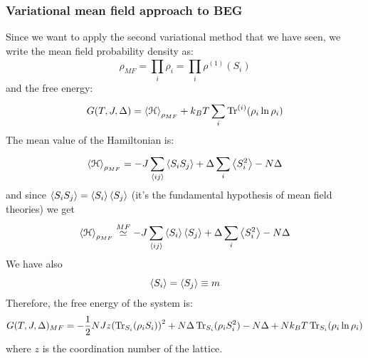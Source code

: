 \documentclass[../main/main.tex]{subfiles}
\begin{document}
\subsubsection{Variational mean field approach to BEG}
Since we want to apply the second variational method that we have seen, we write the mean field probability density as:
\begin{equation*}
  \rho _{MF} = \prod_{i}^{} \rho _i   =  \prod_{i}^{} \rho^{(1)} (S_i)
\end{equation*}
and the free energy:
\begin{equation}
  G(T,J,\Delta ) = \expval{\mathcal{H}}_{\rho _{MF}} + k_B T \sum_{i}^{} \Tr^{(i)}(\rho _i \ln{\rho _i } )
\end{equation}
The mean value of the Hamiltonian is:
\begin{equation*}
\expval{\mathcal{H}}_{\rho _{MF}}   = - J \sum_{\expval{ij} }^{} \expval{S_i S_j}  + \Delta \sum_{i}^{} \expval{S_i^2} - N \Delta  
\end{equation*}
and since \(\expval{S_i S_j} = \expval{S_i} \expval{S_j} \) (it's the fundamental hypothesis of mean field theories) we get
\begin{equation*}
\expval{\mathcal{H}}_{\rho _{MF}} \overset{MF}{\simeq } - J \sum_{\expval{ij} }^{} \expval{S_i} \expval{S_j} + \Delta \sum_{i}^{} \expval{S_i^2} - N \Delta   
\end{equation*}
We have also
\begin{equation*}
  \expval{S_i} = \expval{S_j} \equiv m
\end{equation*}
Therefore, the free energy of the system is:
\begin{equation}
  G(T,J, \Delta )_{MF}  = - \frac{1}{2} N J z \qty( \Tr_{S_i}(\rho _i S_i) )^2
  + N \Delta \Tr_{S_i}(\rho _i S_i^2) - N \Delta +
  N k_B T \Tr_{S_i}(\rho _i \ln{\rho _i} )
\end{equation}
where \(z\) is the coordination number of the lattice.
\end{document}
